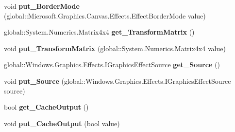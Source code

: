 \begin{DoxyCompactItemize}
void {\bfseries put\+\_\+\+Border\+Mode} (global\+::\+Microsoft.\+Graphics.\+Canvas.\+Effects.\+Effect\+Border\+Mode value)
\item 
\mbox{\label{class_microsoft_1_1_graphics_1_1_canvas_1_1_effects_1_1_transform3_d_effect_aa80b16ff5d14dca3bcbf428286d5496c}} 
global\+::\+System.\+Numerics.\+Matrix4x4 {\bfseries get\+\_\+\+Transform\+Matrix} ()
\item 
\mbox{\label{class_microsoft_1_1_graphics_1_1_canvas_1_1_effects_1_1_transform3_d_effect_a1a29836c35514b1d6cf8834255c05da7}} 
void {\bfseries put\+\_\+\+Transform\+Matrix} (global\+::\+System.\+Numerics.\+Matrix4x4 value)
\item 
\mbox{\label{class_microsoft_1_1_graphics_1_1_canvas_1_1_effects_1_1_transform3_d_effect_aabf75189a0a2858c19e9e0c431ee3e81}} 
global\+::\+Windows.\+Graphics.\+Effects.\+I\+Graphics\+Effect\+Source {\bfseries get\+\_\+\+Source} ()
\item 
\mbox{\label{class_microsoft_1_1_graphics_1_1_canvas_1_1_effects_1_1_transform3_d_effect_a50774a6e92f54c773522cbc57e44ffbf}} 
void {\bfseries put\+\_\+\+Source} (global\+::\+Windows.\+Graphics.\+Effects.\+I\+Graphics\+Effect\+Source source)
\item 
\mbox{\label{class_microsoft_1_1_graphics_1_1_canvas_1_1_effects_1_1_transform3_d_effect_a6fd6a7212abf3fb015bcb55d184efbdf}} 
bool {\bfseries get\+\_\+\+Cache\+Output} ()
\item 
\mbox{\label{class_microsoft_1_1_graphics_1_1_canvas_1_1_effects_1_1_transform3_d_effect_a5f76a4f696cc8f4c885a255b03199352}} 
void {\bfseries put\+\_\+\+Cache\+Output} (bool value)
\item 
\mbox{\label{class_microsoft_1_1_graphics_1_1_canvas_1_1_effects_1_1_transform3_d_effect_aec5e314201704c1f1309e12ce3309775}} 

\end{DoxyCompactItemize}
